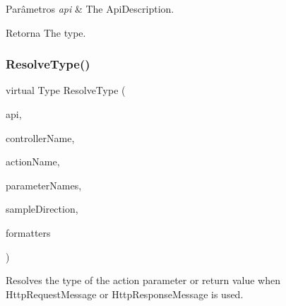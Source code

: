 \begin{DoxyParams}{Parâmetros}
{\em api} & The Api\+Description.\\
\hline
\end{DoxyParams}
\begin{DoxyReturn}{Retorna}
The type.
\end{DoxyReturn}
\mbox{\label{classApi3Layers_1_1Areas_1_1HelpPage_1_1HelpPageSampleGenerator_a71304267702433f40e3c258cf76ca002}} 
\subsubsection{\texorpdfstring{Resolve\+Type()}{ResolveType()}}
{\footnotesize\ttfamily virtual Type Resolve\+Type (\begin{DoxyParamCaption}\item[{Api\+Description}]{api,  }\item[{string}]{controller\+Name,  }\item[{string}]{action\+Name,  }\item[{I\+Enumerable$<$ string $>$}]{parameter\+Names,  }\item[{\hyperlink{namespaceApi3Layers_1_1Areas_1_1HelpPage_abad9f6d2b059d72558bf70415efc32b5}{Sample\+Direction}}]{sample\+Direction,  }\item[{out Collection$<$ Media\+Type\+Formatter $>$}]{formatters }\end{DoxyParamCaption})\hspace{0.3cm}{\ttfamily [virtual]}}



Resolves the type of the action parameter or return value when Http\+Request\+Message or Http\+Response\+Message is used. 


